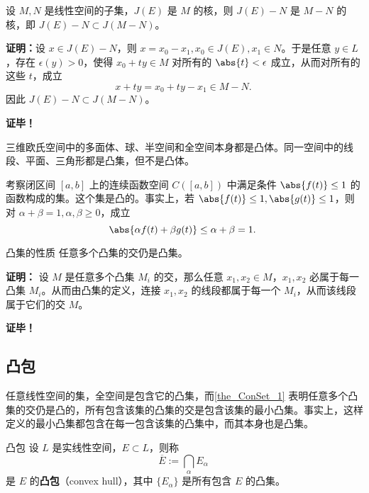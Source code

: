 \begin{theorem}{}
设 $M,N$ 是线性空间的子集，$J(E)$ 是 $M$ 的核，则 $J(E)-N$ 是 $M-N$ 的核，即 $J(E)-N\subset J(M-N)$。
\end{theorem}
\textbf{证明：}设 $x\in J(E)-N$，则 $x=x_0-x_1,x_0\in J(E),x_1\in N$。于是任意 $y\in L$，存在 $\epsilon(y)>0$，使得 $x_0+ty\in M$ 对所有的 $\abs{t}<\epsilon$ 成立，从而对所有的这些 $t$，成立
\begin{equation}
x+ty=x_0+ty-x_1\in M-N.~
\end{equation}
因此 $J(E)-N\subset J(M-N)$。

\textbf{证毕！}

\begin{example}{}
三维欧氏空间中的多面体、球、半空间和全空间本身都是凸体。同一空间中的线段、平面、三角形都是凸集，但不是凸体。
\end{example}

\begin{example}{}
考察闭区间 $[a,b]$ 上的连续函数空间 $C([a,b])$ 中满足条件 $\abs{f(t)}\leq1$ 的函数构成的集。这个集是凸的。事实上，若 $\abs{f(t)}\leq1,\abs{g(t)}\leq1$，则对 $\alpha+\beta=1,\alpha,\beta\geq0$，成立
\begin{equation}
\abs{\alpha f(t)+\beta g(t)}\leq\alpha+\beta=1.~
\end{equation}

\end{example}




\begin{theorem}{凸集的性质}\label{the_ConSet_1}
任意多个凸集的交仍是凸集。
\end{theorem}
\textbf{证明：} 设 $M$ 是任意多个凸集 $M_i$ 的交，那么任意 $x_1,x_2\in M$，$x_1,x_2$ 必属于每一凸集 $M_i$。从而由凸集的定义，连接 $x_1,x_2$ 的线段都属于每一个 $M_i$，从而该线段属于它们的交 $M$。

\textbf{证毕！} 

\subsection{凸包}
任意线性空间的集，全空间是包含它的凸集，而\autoref{the_ConSet_1} 表明任意多个凸集的交仍是凸的，所有包含该集的凸集的交是包含该集的最小凸集。事实上，这样定义的最小凸集都包含在每一包含该集的凸集中，而其本身也是凸集。
\begin{definition}{凸包}
设 $L$ 是实线性空间，$E\subset L$，则称
\begin{equation}
\overline{E}:=\bigcap_{\alpha}E_\alpha~
\end{equation}
是 $E$ 的\textbf{凸包}（convex hull），其中 $\{E_\alpha\}$ 是所有包含 $E$ 的凸集。
\end{definition}

